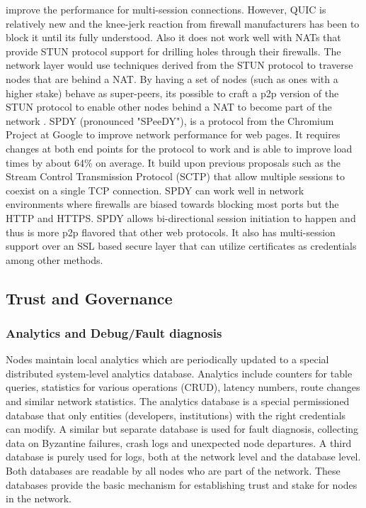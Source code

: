 improve the performance for multi-session connections. However, QUIC is relatively new and the knee-jerk reaction from
firewall manufacturers has been to block it until its fully understood. Also it does not work well with NATs that
provide STUN protocol \cite{stun_protocol} support for drilling holes through their firewalls.  The network layer would use techniques derived from the STUN protocol to traverse nodes
that are behind a NAT. By having a set of nodes (such as ones with a higher stake) behave as
super-peers, its possible to craft a p2p version of the STUN protocol to enable
other nodes behind a NAT to become part of the network \cite{p2p_nat}.
\newline\newline
SPDY (pronounced "SPeeDY"), is a protocol from the Chromium Project at Google \cite{speedy_protocol} to improve network performance for web
pages. It requires changes at both end points for the protocol to work and is able to improve load times by about 64\%
on average. It build upon previous proposals such as the Stream Control Transmission Protocol (SCTP)
\cite{sctp_rfc} that allow multiple sessions to coexist on a single TCP connection. SPDY can work well in network
environments where firewalls are biased towards blocking most ports but the HTTP and HTTPS. SPDY allows bi-directional
session initiation to happen and thus is more p2p flavored that other web protocols. It also has multi-session support
over an SSL based secure layer that can utilize certificates as credentials among other methods.


\subsection{Trust and Governance}
\label{net:gov}

\subsubsection{Analytics and Debug/Fault diagnosis}
Nodes maintain local analytics which are periodically updated to a special distributed system-level analytics
database. Analytics include counters for table queries, statistics for various operations (CRUD), latency numbers, route
changes and similar network statistics. The analytics database is a special permissioned database that only entities
(developers, institutions) with the right credentials can modify. A similar but separate database is used for fault diagnosis, collecting data on Byzantine failures, crash logs and
unexpected node departures. A third database is purely used for logs, both at the network level and the database level. Both databases are readable by all nodes who are part of the network. These databases provide the basic mechanism for
establishing trust and stake for nodes in the network.

